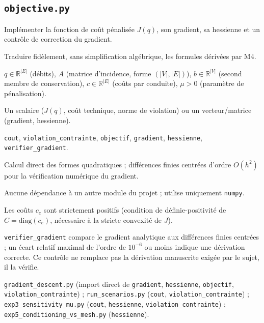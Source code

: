 \documentclass[11pt,a4paper]{article}
\begin{document}
\subsection{\texttt{objective.py}}

\begin{description}[style=nextline]
  \item[Rôle] Implémenter la fonction de coût pénalisée $J(q)$, son
  gradient, sa hessienne et un contrôle de correction du gradient.
  \item[Objectif] Traduire fidèlement, sans simplification algébrique, les
  formules dérivées par M4.
  \item[Entrées] $q \in \mathbb{R}^{|E|}$ (débits), $A$ (matrice
  d'incidence, forme $(|V|,|E|)$), $b \in \mathbb{R}^{|V|}$ (second membre de
  conservation), $c \in \mathbb{R}^{|E|}$ (coûts par conduite), $\mu > 0$
  (paramètre de pénalisation).
  \item[Sorties] Un scalaire ($J(q)$, coût technique, norme de violation) ou
  un vecteur/matrice (gradient, hessienne).
  \item[Principales fonctions] \texttt{cout}, \texttt{violation\_contrainte},
  \texttt{objectif}, \texttt{gradient}, \texttt{hessienne},
  \texttt{verifier\_gradient}.
  \item[Algorithmes] Calcul direct des formes quadratiques ; différences
  finies centrées d'ordre $O(h^2)$ pour la vérification numérique du
  gradient.
  \item[Dépendances] Aucune dépendance à un autre module du projet ; utilise
  uniquement \texttt{numpy}.
  \item[Hypothèses] Les coûts $c_e$ sont strictement positifs (condition de
  définie-positivité de $C = \mathrm{diag}(c_e)$, nécessaire à la stricte
  convexité de $J$).
  \item[Contrôles] \texttt{verifier\_gradient} compare le gradient
  analytique aux différences finies centrées ; un écart relatif maximal de
  l'ordre de $10^{-6}$ ou moins indique une dérivation correcte. Ce contrôle
  ne remplace pas la dérivation manuscrite exigée par le sujet, il la
  vérifie.
  \item[Fichiers qui l'utilisent] \texttt{gradient\_descent.py} (import
  direct de \texttt{gradient}, \texttt{hessienne}, \texttt{objectif},
  \texttt{violation\_contrainte}) ; \texttt{run\_scenarios.py} (\texttt{cout},
  \texttt{violation\_contrainte}) ; \texttt{exp3\_sensitivity\_mu.py}
  (\texttt{cout}, \texttt{hessienne}, \texttt{violation\_contrainte}) ;
  \texttt{exp5\_conditioning\_vs\_mesh.py} (\texttt{hessienne}).
\end{description}
\end{document}
